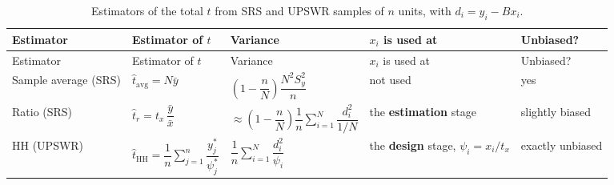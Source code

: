\documentclass[
  letterpaper,
  DIV=11,
  numbers=noendperiod]{scrreprt}
\renewcommand{\[}{\begin{equation}}
\renewcommand{\]}{\end{equation}}
\begin{document}
\begin{longtable}[]{@{}
  >{\raggedright\arraybackslash}p{}
  >{\centering\arraybackslash}p{}
  >{\centering\arraybackslash}p{}
  >{\raggedright\arraybackslash}p{}
  >{\raggedright\arraybackslash}p{}@{}}
\caption{Estimators of the total \(t\) from SRS and UPSWR samples of
\(n\) units, with
\(d_i=y_i-Bx_i\).}\label{tbl-ups-compare}\tabularnewline
\toprule\noalign{}
\begin{minipage}[b]{\linewidth}\raggedright
Estimator
\end{minipage} & \begin{minipage}[b]{\linewidth}\centering
Estimator of \(t\)
\end{minipage} & \begin{minipage}[b]{\linewidth}\centering
Variance
\end{minipage} & \begin{minipage}[b]{\linewidth}\raggedright
\(x_i\) is used at
\end{minipage} & \begin{minipage}[b]{\linewidth}\raggedright
Unbiased?
\end{minipage} \\
\midrule\noalign{}
\endfirsthead
\toprule\noalign{}
\begin{minipage}[b]{\linewidth}\raggedright
Estimator
\end{minipage} & \begin{minipage}[b]{\linewidth}\centering
Estimator of \(t\)
\end{minipage} & \begin{minipage}[b]{\linewidth}\centering
Variance
\end{minipage} & \begin{minipage}[b]{\linewidth}\raggedright
\(x_i\) is used at
\end{minipage} & \begin{minipage}[b]{\linewidth}\raggedright
Unbiased?
\end{minipage} \\
\midrule\noalign{}
\endhead
\bottomrule\noalign{}
\endlastfoot
Sample average (SRS) & \(\hat{t}_{\mathrm{avg}}=N\bar{y}\) &
\(\left(1-\dfrac{n}{N}\right)\dfrac{N^2S_y^2}{n}\) & not used & yes \\
Ratio (SRS) & \(\hat{t}_r=t_x\,\dfrac{\bar{y}}{\bar{x}}\) &
\(\approx\left(1-\dfrac{n}{N}\right)\dfrac{1}{n}\sum\limits_{i=1}^N \dfrac{d_i^2}{1/N}\)
& the \textbf{estimation} stage & slightly biased \\
HH (UPSWR) &
\(\hat{t}_{\mathrm{HH}}=\dfrac1n\sum\limits_{j=1}^n \dfrac{y_j^*}{\psi_j^*}\)
& \(\dfrac{1}{n}\sum\limits_{i=1}^N \dfrac{d_i^2}{\psi_i}\) & the
\textbf{design} stage, \(\psi_i=x_i/t_x\) & exactly unbiased \\
\end{longtable}
\end{document}
